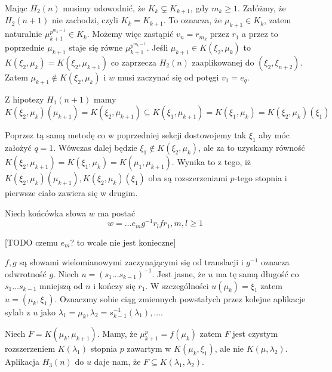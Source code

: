 Mając $H_2(n)$ musimy udowodnić, że $K_k \subsetneq K_{k+1}$, gdy $m_k \geq 1$.
Załóżmy, że $H_2(n+1)$ nie zachodzi, czyli $K_k = K_{k+1}$. To oznacza, że
$\mu_{k+1} \in K_k$, zatem naturalnie $\mu_{k+1}^{p^{m_k -1}} \in K_k$. Możemy
więc zastąpić $v_n = r_{m_k}$ przez $r_1$ a przez to poprzednie $\mu_{k+1}$
staje się równe $\mu_{k+1}^{p^{m_k - 1}}$.
Jeśli $\mu_{k+1} \in K\left(\xi_2, \mu_k\right)$ to $K\left(\xi_2, \mu_k\right)
= K\left(\xi_2, \mu_{k+1}\right)$ co zaprzecza $H_2(n)$ zaaplikowanej do
$\left(\xi_2, \xi_{n+2}\right)$. Zatem $\mu_{k+1} \not \in K\left(\xi_2,
\mu_k\right)$ i $w$ musi zaczynać się od potęgi $v_1 = e_q$.

Z hipotezy $H_1(n+1)$ mamy
\[
  K\left(\xi_2, \mu_k\right) \left(\mu_{k+1}\right)
  =
  K\left(\xi_2, \mu_{k+1}\right)
  \subseteq
  K\left(\xi_1, \mu_{k+1}\right)
  =
  K\left(\xi_1, \mu_{k}\right)
  =
  K\left(\xi_2, \mu_{k}\right)\left(\xi_1\right)
\]

Poprzez tą samą metodę co w poprzedniej sekcji dostowojemy tak $\xi_1$ aby móc
założyć $q = 1$. Wówczas dalej będzie $\xi_1 \not \in K\left(\xi_2,
\mu_k\right)$, ale za to uzyskamy równość
$K\left(\xi_2, \mu_{k+1}\right)
= K\left(\xi_1, \mu_k\right)
= K\left(\mu_1, \mu_{k+1}\right)$. Wynika to z tego, iż
$
K\left(\xi_2, \mu_{k}\right) \left(\mu_{k+1}\right),
K\left(\xi_2, \mu_{k}\right) \left(\xi_{1}\right)$ oba są rozszerzeniami
$p$-tego stopnia i pierwsze ciało zawiera się w drugim.

Niech końcówka słowa $w$ ma postać
\[ w = \ldots e_mg^{-1}r_lfr_1, m,l \geq 1\]

[TODO czemu $e_m$? to wcale nie jest konieczne]

$f, g$ są słowami wielomianowymi zaczynającymi się od translacji i $g^{-1}$
oznacza odwrotność $g$. Niech $u = \left(s_1 \ldots s_{k-1}\right)^{-1}$. Jest
jasne, że $u$ ma tę samą długość co $s_1\ldots s_{k-1}$ mniejszą od $n$ i kończy
się $r_1$. W szczególności $u\left(\mu_k\right) = \xi_1$ zatem $u = \left(\mu_k,
\xi_1\right)$. Oznaczmy sobie ciąg zmiennych powstałych przez kolejne aplikacje
sylab z $u$ jako $\lambda_1 = \mu_k, \lambda_2 =
s_{k-1}^{-1}\left(\lambda_1\right), \ldots$.

Niech $F = K \left(\mu_k, \mu_{k+1}\right)$. Mamy, że
$\mu_{k+1}^p = f\left(\mu_k\right)$ zatem $F$ jest czystym rozszerzeniem
$K\left(\lambda_1 \right)$ stopnia $p$ zawartym w $K \left( \mu_k, \xi_1
\right)$, ale nie $K \left(\mu, \lambda_2 \right)$.
Aplikacja $H_3(n)$ do $u$ daje nam, że $F \subseteq K \left( \lambda_1,
\lambda_2 \right)$.

